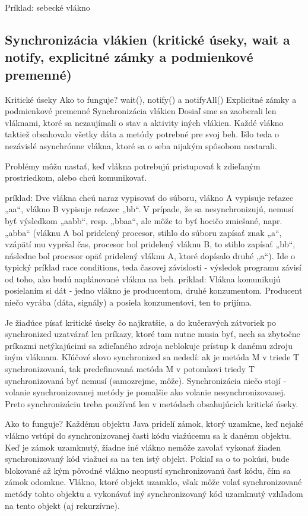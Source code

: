 Príklad: sebecké vlákno


	\subsection{Synchronizácia vlákien (kritické úseky, wait a notify, explicitné zámky a podmienkové premenné)}

Kritické úseky
Ako to funguje?
wait(), notify() a notifyAll()
Explicitné zámky a podmienkové premenné
Synchronizácia vlákien
Dosiaľ sme sa zaoberali len vláknami, ktoré sa nezaujímali o stav a aktivity iných vlákien. Každé vlákno taktiež obsahovalo všetky dáta a metódy potrebné pre svoj beh. Išlo teda o nezávislé asynchrónne vlákna, ktoré sa o seba nijakým spôsobom nestarali.

Problémy môžu nastať, keď vlákna potrebujú pristupovať k zdieľaným prostriedkom, alebo chcú komunikovať.

príklad: Dve vlákna chcú naraz vypisovať do súboru, vlákno A vypisuje reťazec „aa“, vlákno B vypisuje reťazec „bb“. V prípade, že sa nesynchronizujú, nemusí byť výsledkom „aabb“, resp. „bbaa“, ale môže to byť hocičo zmiešané, napr. „abba“ (vláknu A bol pridelený procesor, stihlo do súboru zapísať znak „a“, vzápätí mu vypršal čas, procesor bol pridelený vláknu B, to stihlo zapísať „bb“, následne bol procesor opäť pridelený vláknu A, ktoré dopísalo druhé „a“). Ide o typický príklad race conditions, teda časovej závislosti - výsledok programu závisí od toho, ako budú naplánované vlákna na beh.
príklad: Vlákna komunikujú posielaním si dát - jedno vlákno je producentom, druhé konzumentom. Producent niečo vyrába (dáta, signály) a posiela konzumentovi, ten to prijíma.

	Je žiadúce písať kritické úseky čo najkratšie, a do kučeravých zátvoriek po synchronized uzatvárať len príkazy, ktoré tam nutne musia byť, nech sa zbytočne príkazmi netýkajúcimi sa zdieľaného zdroja neblokuje prístup k danému zdroju iným vláknam. Kľúčové slovo synchronized sa nededí: ak je metóda M v triede T synchronizovaná, tak predefinovaná metóda M v potomkovi triedy T synchronizovaná byť nemusí (samozrejme, môže). Synchronizácia niečo stojí - volanie synchronizovanej metódy je pomalšie ako volanie nesynchronizovanej. Preto synchronizáciu treba používať len v metódach obsahujúcich kritické úseky.

Ako to funguje?
Každému objektu Java pridelí zámok, ktorý uzamkne, keď nejaké vlákno vstúpi do synchronizovanej časti kódu viažúcemu sa k danému objektu. Keď je zámok uzamknutý, žiadne iné vlákno nemôže zavolať vykonať žiaden synchronizovaný kód viažuci sa na ten istý objekt. Pokiaľ sa o to pokúsi, bude blokované až kým pôvodné vlákno neopustí synchronizovanú časť kódu, čím sa zámok odomkne. Vlákno, ktoré objekt uzamklo, však môže volať synchronizované metódy tohto objektu a vykonávať iný synchronizovaný kód uzamknutý vzhľadom na tento objekt (aj rekurzívne).

